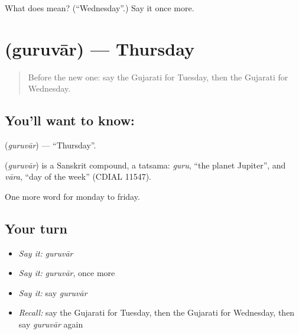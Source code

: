 \begin{tcolorbox}[breakable,colback=teal!4,colframe=teal!35!black,title={Before you move on}]
What does  mean? (\textquotedblleft{}Wednesday\textquotedblright{}.) Say it once more.
\end{tcolorbox}
\section[\texorpdfstring{\gu{ગુરુવાર} (guruvār)}{ગુરુવાર (guruvār)}]{ (guruvār) — Thursday}

\label{lesson:GU-C78-thursday}



\begin{quote}
Before the new one: say the Gujarati for Tuesday, then the Gujarati for Wednesday.
\end{quote}

\subsection*{You'll want to know: }
\textbf{} (\emph{guruvār}) — \textquotedblleft{}Thursday\textquotedblright{}.

\begin{cousinweb}
\textbf{} (\emph{guruvār}) is a Sanskrit compound, a tatsama: \emph{guru}, \textquotedblleft{}the planet Jupiter\textquotedblright{}, and \emph{vāra}, \textquotedblleft{}day of the week\textquotedblright{} (CDIAL 11547).
\end{cousinweb}

\begin{grammarlens}[title={What you've built}]
One more word for monday to friday.
\end{grammarlens}

\subsection*{Your turn}
\begin{itemize}
\raggedright
  \item \emph{Say it:} \emph{guruvār}
  \item \emph{Say it:} \emph{guruvār}, once more
  \item \emph{Say it:} say \emph{guruvār}
  \item \emph{Recall:} say the Gujarati for Tuesday, then the Gujarati for Wednesday, then say \emph{guruvār} again
\end{itemize}

